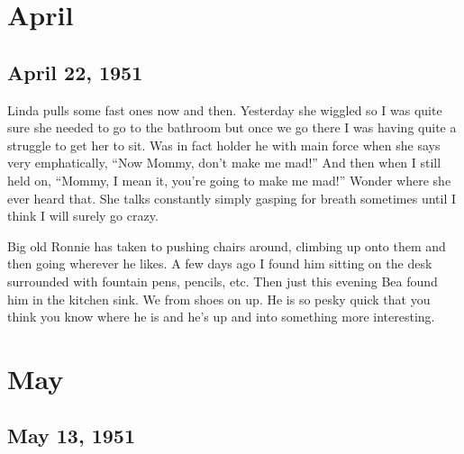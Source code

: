 \documentclass[
]{book}
\begin{document}
\hypertarget{april}{%
\section{April}\label{april}}

\hypertarget{april-22-1951}{%
\subsection{April 22, 1951}\label{april-22-1951}}

Linda pulls some fast ones now and then. Yesterday she wiggled so I was quite sure she needed to go to the bathroom but once we go there I was having quite a struggle to get her to sit. Was in fact holder he with main force when she says very emphatically, ``Now Mommy, don't make me mad!'' And then when I still held on, ``Mommy, I mean it, you're going to make me mad!'' Wonder where she ever heard that. She talks constantly simply gasping for breath sometimes until I think I will surely go crazy.

Big old Ronnie has taken to pushing chairs around, climbing up onto them and then going wherever he likes. A few days ago I found him sitting on the desk surrounded with fountain pens, pencils, etc. Then just this evening Bea found him in the kitchen sink. We from shoes on up. He is so pesky quick that you think you know where he is and he's up and into something more interesting.

\hypertarget{may-2}{%
\section{May}\label{may-2}}

\hypertarget{may-13-1951}{%
\subsection{May 13, 1951}\label{may-13-1951}}
\end{document}
